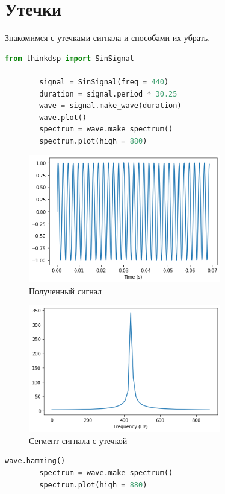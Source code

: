 \documentclass[a4paper, 12pt]{report}
\begin{document}
	\chapter{Утечки}
	Знакомимся с утечками сигнала и способами их убрать.
	\begin{lstlisting}[language=Python,caption=Спектр сигнала]
		from thinkdsp import SinSignal

		signal = SinSignal(freq = 440)
		duration = signal.period * 30.25
		wave = signal.make_wave(duration)
		wave.plot()
		spectrum = wave.make_spectrum()
		spectrum.plot(high = 880)
	\end{lstlisting}
	\begin{figure}[H]
		\centering
		\includegraphics[width=0.75\textwidth]{leak1.png}
		\caption{Полученный сигнал}
		\label{fig:leak1}
	\end{figure}
	\begin{figure}[H]
		\centering
		\includegraphics[width=0.75\textwidth]{leak2.png}
		\caption{Сегмент сигнала с утечкой}
		\label{fig:leak2}
	\end{figure}
	\begin{lstlisting}[language=Python,caption=Исправление сигнала функцией Хэмминга]
		wave.hamming()
		spectrum = wave.make_spectrum()
		spectrum.plot(high = 880)
	\end{lstlisting}
\end{document}
